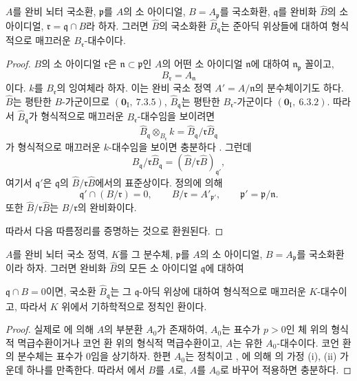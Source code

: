 \begin{theorem}[22.3.3]
\label{0.22.3.3-ko}
$A$를 완비 뇌터 국소환, $\mathfrak p$를 $A$의 소 아이디얼,
$B=A_\mathfrak p$를 국소화환, $\mathfrak q$를 완비화 $\widehat B$의
소 아이디얼, $\mathfrak r=\mathfrak q\cap B$라 하자. 그러면
$\widehat B$의 국소화환 $\widehat B_\mathfrak q$는 준아딕 위상들에
대하여 형식적으로 매끄러운 $B_\mathfrak r$-대수이다.
\end{theorem}

\begin{proof}
$B$의 소 아이디얼 $\mathfrak r$은
$\mathfrak n\subset\mathfrak p$인 $A$의 어떤 소 아이디얼
$\mathfrak n$에 대하여 $\mathfrak n_\mathfrak p$ 꼴이고,
\[
  B_\mathfrak r=A_\mathfrak n
\]
이다. $k$를 $B_\mathfrak r$의 잉여체라 하자. 이는 완비 국소 정역
$A'=A/\mathfrak n$의 분수체이기도 하다. $\widehat B$는 평탄한
$B$-가군이므로 $(\mathbf 0_\mathrm I,~7.3.5)$,
$\widehat B_\mathfrak q$는 평탄한 $B_\mathfrak r$-가군이다
$(\mathbf 0_\mathrm I,~6.3.2)$. 따라서
$\widehat B_\mathfrak q$가 형식적으로 매끄러운
$B_\mathfrak r$-대수임을 보이려면
\[
  \widehat B_\mathfrak q\otimes_{B_\mathfrak r}k
  =\widehat B_\mathfrak q/\mathfrak r\widehat B_\mathfrak q
\]
가 형식적으로 매끄러운 $k$-대수임을 보이면 충분하다
. 그런데
\[
  \widehat B_\mathfrak q/\mathfrak r\widehat B_\mathfrak q
  =(\widehat B/\mathfrak r\widehat B)_{\mathfrak q'},
\]
여기서 $\mathfrak q'$은 $\mathfrak q$의
$\widehat B/\mathfrak r\widehat B$에서의 표준상이다. 정의에 의해
\[
  \mathfrak q'\cap(B/\mathfrak r)=0,
  \qquad B/\mathfrak r=A'_{\mathfrak p'},
  \qquad \mathfrak p'=\mathfrak p/\mathfrak n.
\]
또한 $\widehat B/\mathfrak r\widehat B$는 $B/\mathfrak r$의
완비화이다.

따라서 다음 따름정리를 증명하는 것으로 환원된다.
\end{proof}

\begin{corollary}[22.3.4]
\label{0.22.3.4-ko}
$A$를 완비 뇌터 국소 정역, $K$를 그 분수체, $\mathfrak p$를 $A$의
소 아이디얼, $B=A_\mathfrak p$를 국소화환이라 하자. 그러면 완비화
$\widehat B$의 모든 소 아이디얼 $\mathfrak q$에 대하여


$\mathfrak q\cap B=0$이면, 국소환 $\widehat B_\mathfrak q$는 그
$\mathfrak q$-아딕 위상에 대하여 형식적으로 매끄러운 $K$-대수이고,
따라서 $K$ 위에서 기하학적으로 정칙인 환이다.
\end{corollary}

\begin{proof}
실제로 에 의해 $A$의 부분환 $A_0$가 존재하여,
$A_0$는 표수가 $p>0$인 체 위의 형식적 멱급수환이거나 코언 환 위의
형식적 멱급수환이고, $A$는 유한 $A_0$-대수이다. 코언 환의 분수체는
표수가 $0$임을 상기하자. 한편 $A_0$는 정칙이고
, 에 의해
의 가정 (i), (ii) 가운데 하나를 만족한다. 따라서
에서 $B$를 $A$로, $A$를 $A_0$로 바꾸어 적용하면
충분하다.
\end{proof}

